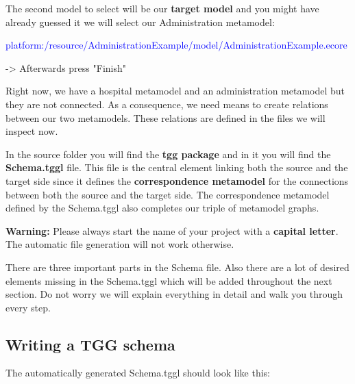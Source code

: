 The second model to select will be our \textbf{target model} and you might have already guessed it we will select our Administration metamodel: \newline

\centering

\textcolor{Blue}{\textsf{platform:/resource/AdministrationExample/model/AdministrationExample.ecore}}\newline

-> Afterwards press \textsf{"Finish"}\newline

\raggedright

Right now, we have a hospital metamodel and an administration metamodel but they are not connected. As a consequence, we need means to create relations between our two metamodels. These relations are defined in the files we will inspect now.

In the source folder you will find the \textbf{tgg package} and in it you will find the \textbf{Schema.tggl} file. This file is the central element linking both the source and the target side since it defines the \textbf{correspondence metamodel} for the connections between both the source and the target side. The correspondence metamodel defined by the Schema.tggl also completes our triple of metamodel graphs.\newline

\textbf{Warning:} Please always start the name of your project with a \textbf{capital letter}. The automatic file generation will not work otherwise.\newline

There are three important parts in the Schema file. Also there are a lot of desired elements missing in the Schema.tggl which will be added throughout the next section. Do not worry we will explain everything in detail and walk you through every step.
\clearpage

\subsection{Writing a TGG schema}

The automatically generated Schema.tggl should look like this:\newline

